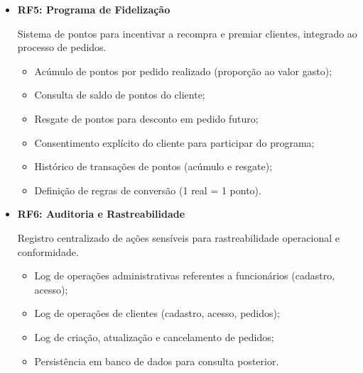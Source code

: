\begin{itemize}
  \item \textbf{RF5: Programa de Fidelização}

  Sistema de pontos para incentivar a recompra e premiar clientes, integrado ao processo de pedidos.

  \begin{itemize}[topsep=0pt, itemsep=0pt]
    \item Acúmulo de pontos por pedido realizado (proporção ao valor gasto);
    \item Consulta de saldo de pontos do cliente;
    \item Resgate de pontos para desconto em pedido futuro;
    \item Consentimento explícito do cliente para participar do programa;
    \item Histórico de transações de pontos (acúmulo e resgate);
    \item Definição de regras de conversão (1 real = 1 ponto).
  \end{itemize}
\end{itemize}

\begin{itemize}
  \item \textbf{RF6: Auditoria e Rastreabilidade}

  Registro centralizado de ações sensíveis para rastreabilidade operacional e conformidade.

  \begin{itemize}[topsep=0pt, itemsep=0pt]
    \item Log de operações administrativas referentes a funcionários (cadastro, acesso);
    \item Log de operações de clientes (cadastro, acesso, pedidos);
    \item Log de criação, atualização e cancelamento de pedidos;
    \item Persistência em banco de dados para consulta posterior.
  \end{itemize}
\end{itemize}

